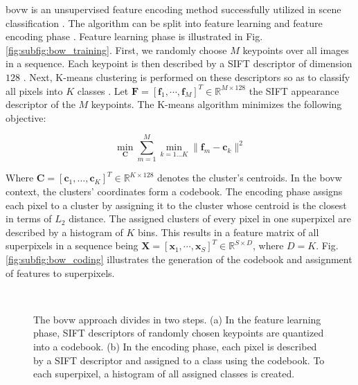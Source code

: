 \gls{bovw} is an unsupervised feature encoding method successfully utilized in scene classification \cite{zhang15}.
The algorithm can be split into feature learning and feature encoding phase \cite{cheriyadat14}.
Feature learning phase is illustrated in Fig. \ref{fig:subfig:bow_training}.
First, we randomly choose $M$ keypoints over all images in a sequence.
Each keypoint is then described by a SIFT descriptor of dimension $128$ \cite{lowe04}.
Next, K-means clustering is performed on these descriptors so as to classify all pixels into $K$ classes \cite{lloyd1982}.
Let $\boldsymbol{F} = [\boldsymbol{f}_1,\cdots,\boldsymbol{f}_M]^T \in \mathbb{R}^{M \times 128}$ the SIFT appearance descriptor of the $M$ keypoints.
The K-means algorithm minimizes the following objective:

\begin{equation}
   \min_{\boldsymbol{C}} \sum_{m=1}^M \min_{k=1...K} \|\boldsymbol{f}_m - \boldsymbol{c}_k\|^2
   \label{eq:k_means} 
\end{equation}
\vspace{6pt}

Where $\boldsymbol{C} = [\boldsymbol{c}_1,...,\boldsymbol{c}_K]^T \in \mathbb{R}^{K \times 128}$ denotes the cluster's centroids.
In the \gls{bovw} context, the clusters' coordinates form a codebook.
The encoding phase assigns each pixel to a cluster by assigning it to the cluster whose centroid is the closest in terms of $L_{2}$ distance.
The assigned clusters of every pixel in one superpixel are described by a histogram of $K$ bins.
This results in a feature matrix of all superpixels in a sequence being $\boldsymbol{X} = [\boldsymbol{x}_1,\cdots,\boldsymbol{x}_S]^T \in \mathbb{R}^{S \times D}$, where $D = K$.
Fig. \ref{fig:subfig:bow_coding} illustrates the generation of the codebook and assignment of features to superpixels.

\begin{figure}[htbp]
  \centering
  \\
  \caption[BoVW illustration]{The \gls{bovw} approach divides in two steps.
    (a) In the feature learning phase, SIFT descriptors of randomly chosen keypoints are quantized into a codebook.
    (b) In the encoding phase, each pixel is described by a SIFT descriptor and assigned to a class using the codebook.
    To each superpixel, a histogram of all assigned classes is created.}
  \label{fig:BoVW_approch}  
\end{figure}

